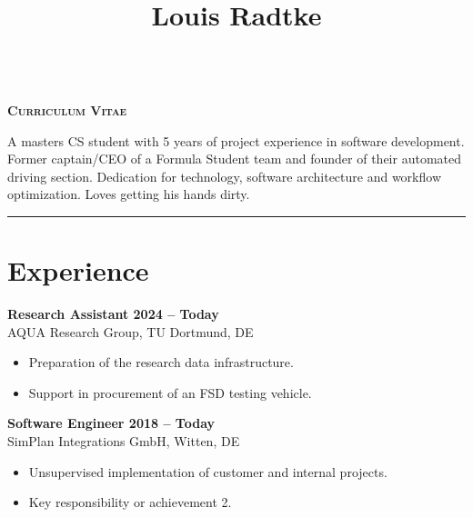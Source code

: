 \documentclass[a4paper,11pt]{article}
\newcommand{\subsectionskip}[0]{\vspace{0.125cm}}
\newcommand{\col}[2]{\textcolor[HTML]{#1}{#2}}
\begin{document}
\hfill
\begin{minipage}[t]{0.65\textwidth}
    \vspace{0cm} %
    \begin{center}
        \title*{\Huge \textbf{Louis Radtke}}\\
        \textsc{\textbf{Curriculum Vitae}}
    \end{center}

    \vspace{0.125cm}

    {
        \small A masters CS student with 5 years of project experience in software development. Former captain/CEO of a Formula Student team and founder of their automated driving section. Dedication for technology, software architecture and workflow optimization. Loves getting his hands dirty.
    }


    \vspace{0.25cm}
    \hrule

    \section*{\col{ac7448}{Experience}}
    \col{b27c52}{\textbf{Research Assistant \hfill 2024 -- Today}}\\
    AQUA Research Group, TU Dortmund, DE
    \begin{itemize}
        \small
        \item Preparation of the research data infrastructure.
        \item Support in procurement of an FSD testing vehicle.
    \end{itemize}

    \subsectionskip

    \col{b3805b}{\textbf{Software Engineer \hfill 2018 -- Today}} \\
    SimPlan Integrations GmbH, Witten, DE
    \begin{itemize}
        \small
        \item Unsupervised implementation of customer and internal projects.
        \item Key responsibility or achievement 2.
    \end{itemize}


\end{minipage}
\end{document}
